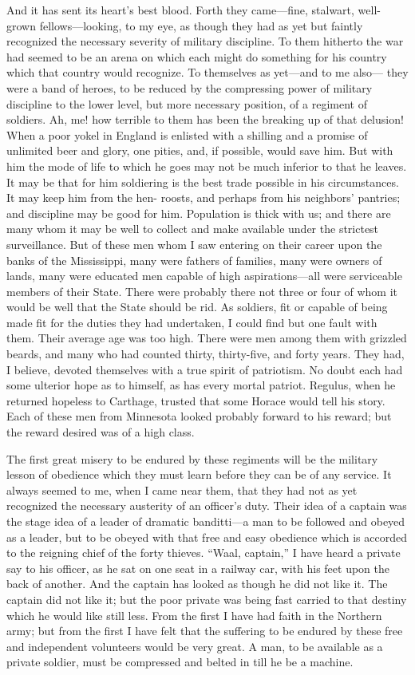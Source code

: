 And it has sent its heart's best blood.  Forth they came---fine,
stalwart, well-grown fellows---looking, to my eye, as though they
had as yet but faintly recognized the necessary severity of
military discipline.  To them hitherto the war had seemed to be an
arena on which each might do something for his country which that
country would recognize.  To themselves as yet---and to me also---%
they were a band of heroes, to be reduced by the compressing power
of military discipline to the lower level, but more necessary
position, of a regiment of soldiers.  Ah, me! how terrible to them
has been the breaking up of that delusion!  When a poor yokel in
England is enlisted with a shilling and a promise of unlimited beer
and glory, one pities, and, if possible, would save him.  But with
him the mode of life to which he goes may not be much inferior to
that he leaves.  It may be that for him soldiering is the best
trade possible in his circumstances.  It may keep him from the hen-
roosts, and perhaps from his neighbors' pantries; and discipline
may be good for him.  Population is thick with us; and there are
many whom it may be well to collect and make available under the
strictest surveillance.  But of these men whom I saw entering on
their career upon the banks of the Mississippi, many were fathers
of families, many were owners of lands, many were educated men
capable of high aspirations---all were serviceable members of their
State.  There were probably there not three or four of whom it
would be well that the State should be rid.  As soldiers, fit or
capable of being made fit for the duties they had undertaken, I
could find but one fault with them.  Their average age was too
high.  There were men among them with grizzled beards, and many who
had counted thirty, thirty-five, and forty years.  They had, I
believe, devoted themselves with a true spirit of patriotism.  No
doubt each had some ulterior hope as to himself, as has every
mortal patriot.  Regulus, when he returned hopeless to Carthage,
trusted that some Horace would tell his story.  Each of these men
from Minnesota looked probably forward to his reward; but the
reward desired was of a high class.

The first great misery to be endured by these regiments will be the
military lesson of obedience which they must learn before they can
be of any service.  It always seemed to me, when I came near them,
that they had not as yet recognized the necessary austerity of an
officer's duty.  Their idea of a captain was the stage idea of a
leader of dramatic banditti---a man to be followed and obeyed as a
leader, but to be obeyed with that free and easy obedience which is
accorded to the reigning chief of the forty thieves.  ``Waal,
captain,'' I have heard a private say to his officer, as he sat on
one seat in a railway car, with his feet upon the back of another.
And the captain has looked as though he did not like it.  The
captain did not like it; but the poor private was being fast
carried to that destiny which he would like still less.  From the
first I have had faith in the Northern army; but from the first I
have felt that the suffering to be endured by these free and
independent volunteers would be very great.  A man, to be available
as a private soldier, must be compressed and belted in till he be a
machine.

